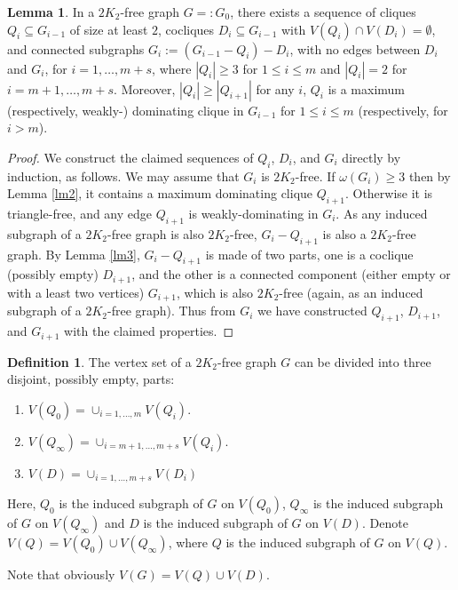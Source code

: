 \documentclass{amsart}
\theoremstyle{definition}
\newtheorem{lemma}{Lemma}
\newtheorem{definition}{Definition}
\begin{document}
\begin{lemma}\label{lm5}
In a $2K_2$-free graph $G=:G_0$, there exists a sequence of cliques
$Q_i\subseteq G_{i-1}$ of size at least $2$, cocliques $D_i\subseteq G_{i-1}$
with $V(Q_i)\cap V(D_i)=\emptyset$,  
and connected subgraphs $G_{i}:=(G_{i-1}-Q_{i})-D_{i}$, with
no edges between $D_i$ and $G_i$,  for
$i=1,\ldots,m+s$, where
$|Q_i|\ge3$ for $1\le i\le m$ and $|Q_i|=2$ for $i=m+1,\ldots,m+s$.
Moreover, $|Q_i|\ge|Q_{i+1}|$ for any $i$, $Q_i$ is a maximum
(respectively, weakly-) dominating
clique in $G_{i-1}$ for $1\leq i\leq m$ (respectively, for $i>m$).
\end{lemma}
\begin{proof}
We construct the claimed sequences of $Q_i$, $D_i$, 
and $G_i$ directly by induction, as follows. 
We may assume that $G_i$ is $2K_2$-free.
If $\omega(G_i)\ge3$ then by Lemma \ref{lm2}, it contains a 
maximum dominating clique $Q_{i+1}$.
Otherwise it is triangle-free, and any edge $Q_{i+1}$ is weakly-dominating
in $G_i$.
As any induced subgraph of a $2K_2$-free
graph is also $2K_2$-free, $G_i-Q_{i+1}$ is also a $2K_2$-free graph.
By Lemma \ref{lm3}, $G_i-Q_{i+1}$ is made of two parts, one is a coclique
(possibly empty) $D_{i+1}$, and the other is a connected
component (either empty or with a least two vertices) $G_{i+1}$, which is also
$2K_2$-free (again, as an induced subgraph of a $2K_2$-free graph).
Thus from $G_i$ we have constructed $Q_{i+1}$, $D_{i+1}$, and $G_{i+1}$
with the  claimed properties.
\end{proof}


\begin{definition}\label{lm6}
The vertex set of a $2K_2$-free graph $G$ can be divided into three disjoint, 
possibly empty, parts:
\begin{enumerate}
\item $V(Q_0)=\cup_{i=1,\ldots,m}V(Q_i).$\label{Vq0}
\item $V(Q_{\infty})=\cup_{i=m+1,\ldots,m+s}V(Q_i).$\label{Vqinfty}
\item $V(D)=\cup_{i=1,\ldots,m+s}V(D_i)$\label{Vd}
\end{enumerate}
Here, $Q_0$ is the induced subgraph of $G$ on $V(Q_0)$, $Q_{\infty}$ is the induced subgraph of $G$ on $V(Q_{\infty})$ and $D$ is the induced subgraph of $G$ on $V(D)$. 
Denote $V(Q)=V(Q_0)\cup V(Q_{\infty})$, where $Q$ is the induced subgraph of $G$ on $V(Q)$. 
\end{definition}
Note that obviously $V(G)=V(Q)\cup V(D)$.
\end{document}

